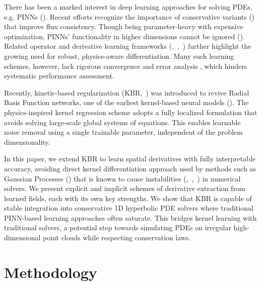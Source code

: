 \documentclass{article} %
\theoremstyle{plain}
\begin{document}
There has been a marked interest in deep learning approaches for solving PDEs, e.g. PINNs (\cite{raissi2019physics}). Recent efforts recognize the importance of conservative variants (\cite{Jagtap2020cPINNs}) that improve flux consistency. Though being parameter-heavy with expensive optimization, PINNs' functionality in higher dimensions cannot be ignored (\cite{kumar2026robust}). Related operator and derivative learning frameworks (\cite{lu2021learning},~\cite{li2021fourier},~\cite{Ledesma2020DifferentialNeuralNetworks}) further highlight the growing need for robust, physics-aware differentiation. Many such learning schemes, however, lack rigorous convergence and error analysis \cite{wang2022and}, which hinders systematic performance assessment.

Recently, kinetic-based regularization (KBR,~\cite{Ganguly_2025}) was introduced to revive Radial Basis Function networks, one of the earliest kernel-based neural models (\cite{broomhead1988rbf}). 
The physics-inspired kernel regression scheme adopts a fully localized formulation that avoids solving large-scale global systems of equations. This enables learnable noise removal using a single trainable parameter, independent of the problem dimensionality.

In this paper, we extend KBR to learn spatial derivatives with fully interpretable accuracy, avoiding direct kernel differentiation approach used by methods such as Gaussian Processes (\cite{rasmussen2006gaussian}) that is known to cause instabilities (\cite{gingold1977sph},~\cite{bardenhagen2001mpm},~\cite{monaghan2005sph}) in numerical solvers. We present explicit and implicit schemes of derivative extraction from learned fields, each with its own key strengths. We show that KBR is capable of stable integration into conservative 1D hyperbolic PDE solvers where traditional PINN-based learning approaches often saturate. This bridges kernel learning with traditional solvers, a potential step towards simulating PDEs on irregular high-dimensional point clouds while respecting conservation laws.




\section{Methodology}
\end{document}
